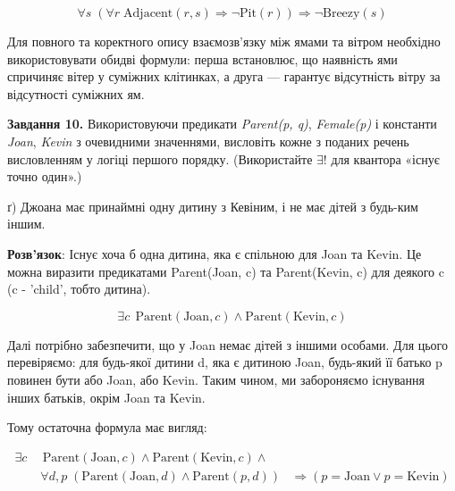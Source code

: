 \documentclass[a4paper,14pt]{extarticle} %
\begin{document}
\[
    \forall s\; \left( \forall r\; \text{Adjacent}(r, s) \Rightarrow \neg\text{Pit}(r) \right) \Rightarrow \neg\text{Breezy}(s)
\]


Для повного та коректного опису взаємозв'язку між ямами та вітром необхідно використовувати
обидві формули: перша встановлює, що наявність ями спричиняє вітер у суміжних клітинках, а
друга — гарантує відсутність вітру за відсутності суміжних ям.

\vspace{1cm} %
\textbf{Завдання 10.} Використовуючи предикати \textit{Parent(p, q)}, \textit{Female(p)}
і константи \textit{Joan}, \textit{Kevin} з очевидними значеннями, висловіть кожне з поданих речень
висловленням у логіці першого порядку. (Використайте $\exists!$ для квантора «існує точно один».)

ґ) Джоана має принаймні одну дитину з Кевіним, і не має дітей з будь-ким іншим.

\indent \textbf{Розв'язок}: Існує хоча б одна дитина, яка є спільною для Joan та Kevin.
Це можна виразити предикатами
Parent(Joan, c) та Parent(Kevin, c) для деякого c (c - 'child', тобто дитина).

\[
    \exists c\; \, \text{Parent}(\text{Joan}, c) \land \text{Parent}(\text{Kevin}, c)
\]

Далі потрібно забезпечити, що у Joan немає дітей з іншими особами. Для цього перевіряємо:
для будь-якої дитини d, яка є дитиною Joan, будь-який її батько p повинен бути або Joan, або Kevin.
Таким чином, ми забороняємо існування інших батьків, окрім Joan та Kevin.

Тому остаточна формула має вигляд:

\[
    \begin{aligned}
        \exists c\; & \, \text{Parent}(\text{Joan}, c) \land \text{Parent}(\text{Kevin}, c) \land \\
                    & \forall d, p\; \left( \text{Parent}(\text{Joan}, d) \land \text{Parent}(p, d) \right)
                    & \Rightarrow (p = \text{Joan} \lor p = \text{Kevin})
    \end{aligned}
\]
\end{document}
